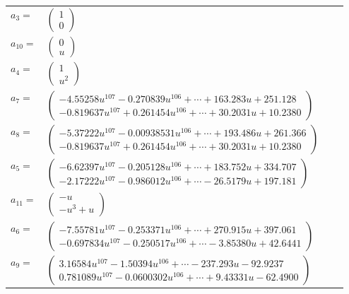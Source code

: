 \documentclass[1p]{elsarticle_modified}
\theoremstyle{definition}
\begin{document}
\begin{tabular}{m{7pt} m{180pt} m{7pt} m{180pt} }
\flushright $a_{3}=$&$\begin{pmatrix}1\\0\end{pmatrix}$ \\
\flushright $a_{10}=$&$\begin{pmatrix}0\\u\end{pmatrix}$ \\
\flushright $a_{4}=$&$\begin{pmatrix}1\\u^2\end{pmatrix}$ \\
\flushright $a_{7}=$&$\begin{pmatrix}-4.55258 u^{107}-0.270839 u^{106}+\cdots+163.283 u+251.128\\-0.819637 u^{107}+0.261454 u^{106}+\cdots+30.2031 u+10.2380\end{pmatrix}$ \\
\flushright $a_{8}=$&$\begin{pmatrix}-5.37222 u^{107}-0.00938531 u^{106}+\cdots+193.486 u+261.366\\-0.819637 u^{107}+0.261454 u^{106}+\cdots+30.2031 u+10.2380\end{pmatrix}$ \\
\flushright $a_{5}=$&$\begin{pmatrix}-6.62397 u^{107}-0.205128 u^{106}+\cdots+183.752 u+334.707\\-2.17222 u^{107}-0.986012 u^{106}+\cdots-26.5179 u+197.181\end{pmatrix}$ \\
\flushright $a_{11}=$&$\begin{pmatrix}- u\\- u^3+u\end{pmatrix}$ \\
\flushright $a_{6}=$&$\begin{pmatrix}-7.55781 u^{107}-0.253371 u^{106}+\cdots+270.915 u+397.061\\-0.697834 u^{107}-0.250517 u^{106}+\cdots-3.85380 u+42.6441\end{pmatrix}$ \\
\flushright $a_{9}=$&$\begin{pmatrix}3.16584 u^{107}-1.50394 u^{106}+\cdots-237.293 u-92.9237\\0.781089 u^{107}-0.0600302 u^{106}+\cdots+9.43331 u-62.4900\end{pmatrix}$ \\

\end{tabular}
\end{document}
